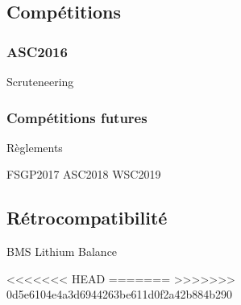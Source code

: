 \subsection{Compétitions}


\subsubsection{ASC2016}

Scruteneering

\subsubsection{Compétitions futures}

Règlements


FSGP2017
ASC2018
WSC2019



\subsection{Rétrocompatibilité}



BMS Lithium Balance

%
%
%
%
<<<<<<< HEAD
=======
>>>>>>> 0d5e6104e4a3d6944263be611d0f2a42b884b290
